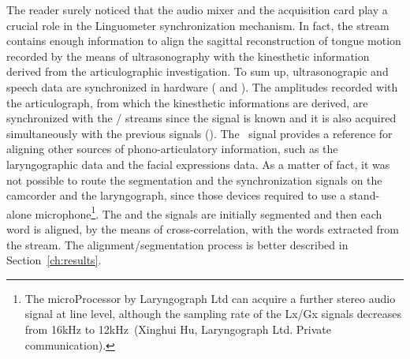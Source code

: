 The reader surely noticed that the audio mixer and the acquisition card play a
crucial role in the Linguometer synchronization mechanism.
In fact, the  stream contains enough information to align the sagittal
reconstruction of tongue motion recorded by the means of ultrasonography with 
the kinesthetic information derived from the articulographic investigation.
To sum up, ultrasonograpic and speech data are synchronized in hardware
( and ).
The amplitudes recorded with the articulograph, from which the kinesthetic
informations are derived, are synchronized with the /
streams since the  signal is known and it is also acquired
simultaneously with the previous signals ().
The~ signal provides a reference for aligning other sources of
phono-articulatory information, such as the laryngographic data and the facial
expressions data.
As a matter of fact, it was not possible to route the segmentation and the
synchronization signals on the camcorder and the laryngograph, since those
devices required to use a stand-alone microphone\footnote{The microProcessor by 
Laryngograph Ltd can acquire a
further stereo audio signal at line level, although the sampling rate of the
Lx/Gx signals decreases from 16kHz to 12kHz~(Xinghui Hu, Laryngograph Ltd.
Private communication).}.
The  and the  signals are initially segmented and
then each word is aligned, by the means of cross-correlation, with the words 
extracted from the  stream. The alignment/segmentation process
is better described in Section~\ref{ch:results}.
\pagebreak
